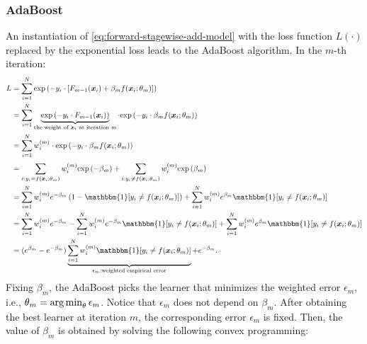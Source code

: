     \subsubsection{AdaBoost}
         An instantiation of \eqref{eq:forward-stagewise-add-model} with the loss function $L(\cdot)$ replaced by the exponential loss leads to the AdaBoost algorithm.
        In the $m$-th iteration:
            \begin{equation}
                \begin{aligned}
                    L & = \sum_{i=1}^{\ndata}{ \EXP{ - y_i \cdot \left[F_{m-1}(\bm{x}_i) + \beta_m f(\bm{x}_i; \theta_m) \right] } }\\
                      & = \sum_{i=1}^{\ndata}{\underbrace{\EXP{-y_i \cdot F_{m-1}(\bm{x}_i)}}_{\text{the weight of $\bm{x}_i$ at iteration $m$}} \cdot \EXP{-y_i \cdot \beta_m f(\bm{x}_i; \theta_m)} }\\
                      & = \sum_{i=1}^{\ndata}{w_i^{(m)} \cdot \EXP{-y_i \cdot \beta_m f(\bm{x}_i; \theta_m)}} \\
                      & = \sum_{i:y_i = f(\bm{x}_i;\theta_m)}^{}{w_i^{(m)} \EXP{-\beta_m}} + \sum_{i:y_i \ne f(\bm{x}_i;\theta_m)}^{}{w_i^{(m)} \EXP{\beta_m}} \\
                      & = \sum_{i=1}^{\ndata}{w^{(m)}_i e^{-\beta_m} \left( 1- \mathbbm{1}[y_i \ne f(\bm{x}_i; \theta_m)] \right)} + \sum_{i=1}^{\ndata}{w^{(m)}_i e^{\beta_m} \mathbbm{1}[y_i \ne f(\bm{x}_i; \theta_m)]} \\
                      & = \sum_{i=1}^{\ndata}{w^{(m)}_i e^{-\beta_m}} - \sum_{i=1}^{\ndata}{w^{(m)}_i e^{-\beta_m} \mathbbm{1}[y_i \ne f(\bm{x}_i; \theta_m)]} + \sum_{i=1}^{\ndata}{w^{(m)}_i e^{\beta_m} \mathbbm{1}[y_i \ne f(\bm{x}_i; \theta_m)]} \\
                      & = (e^{\beta_m} - e^{-\beta_m}) \underbrace{\sum_{i=1}^{\ndata}{w^{(m)}_i \mathbbm{1}[y_i \ne f(\bm{x}_i; \theta_m)]}}_{\epsilon_m: \text{weighted empirical error}} + e^{-\beta_m}.
                \end{aligned}
            \end{equation}
        Fixing $\beta_m$, the AdaBoost picks the learner that minimizes the weighted error $\epsilon_m$, i.e., $\theta_m = \operatorname{arg\,min}_{\theta} \epsilon_m$.
        Notice that $\epsilon_m$ does not depend on $\beta_m$.
        After obtaining the best learner at iteration $m$, the corresponding error $\epsilon_m$ is fixed.
        Then, the value of $\beta_m$ is obtained by solving the following convex programming:
